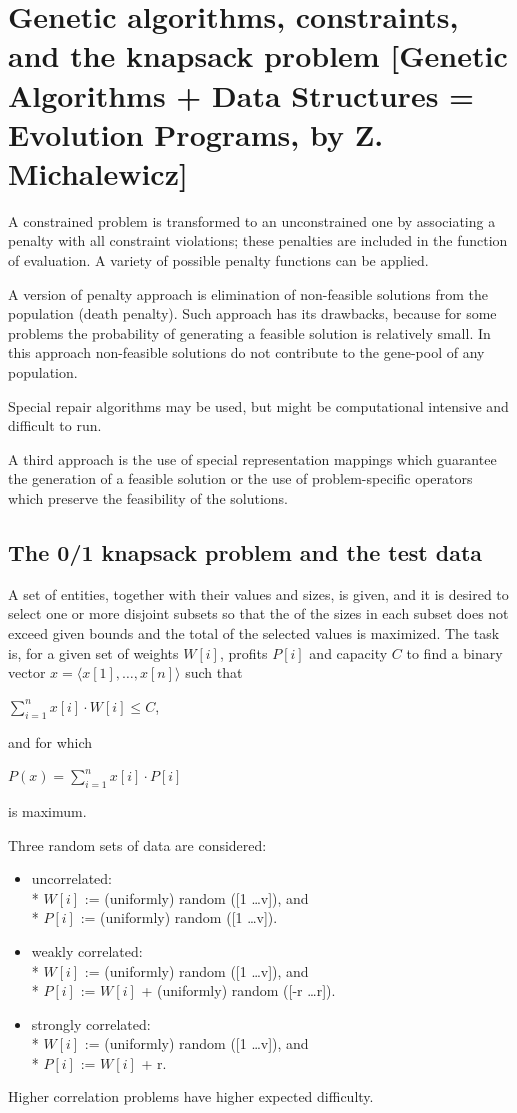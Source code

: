 \documentclass[12pt]{book}
\begin{document}
\section{Genetic algorithms, constraints, and the knapsack problem [Genetic Algorithms + Data Structures = Evolution Programs, by Z. Michalewicz]}
A constrained problem is transformed to an unconstrained one by associating a penalty with all constraint violations; these penalties are included in the function of evaluation. A variety of possible penalty functions can be applied.

A version of penalty approach is elimination of non-feasible solutions from the population (death penalty). Such approach has its drawbacks, because for some problems the probability of generating a feasible solution is relatively small. In this approach non-feasible solutions do not contribute to the gene-pool of any population.

Special repair algorithms may be used, but might be computational intensive and difficult to run.

A third approach is the use of special representation mappings which guarantee the generation of a feasible solution or the use of problem-specific operators which preserve the feasibility of the solutions.

\subsection{The 0/1 knapsack problem and the test data}
A set of entities, together with their values and sizes, is given, and it is desired to select one or more disjoint subsets so that the of the sizes in each subset does not exceed given bounds and the total of the selected values is maximized. The task is, for a given set of weights $W[i]$, profits $P[i]$ and capacity $C$ to find a binary vector $x = \langle x[1], \dots, x[n]\rangle$ such that
\begin{center}
$\sum_{i = 1}^{n}x[i] \cdot W[i] \le C$,
\end{center}
and for which
\begin{center}
$P(x) = \sum_{i = 1}^{n}x[i] \cdot P[i]$
\end{center}
is maximum.

Three random sets of data are considered:
\begin{itemize}
\item uncorrelated:\\*
$W[i]$ := (uniformly) random ([1 \dots v]), and\\*
$P[i]$ := (uniformly) random ([1 \dots v]).
\item weakly correlated:\\*
$W[i]$ := (uniformly) random ([1 \dots v]), and\\*
$P[i]$ := $W[i]$ + (uniformly) random ([-r \dots r]).
\item strongly correlated:\\*
$W[i]$ := (uniformly) random ([1 \dots v]), and\\*
$P[i]$ := $W[i]$ + r.
\end{itemize}
Higher correlation problems have higher expected difficulty.
\end{document}
